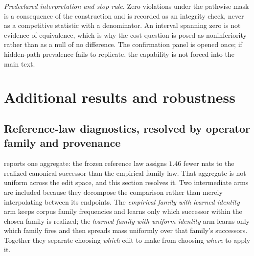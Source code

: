 \emph{Predeclared interpretation and stop rule.} Zero violations under the pathwise mask is a consequence of the construction and is recorded as an integrity check, never as a competitive statistic with a denominator. An interval spanning zero is not evidence of equivalence, which is why the cost question is posed as noninferiority rather than as a null of no difference. The confirmation panel is opened once; if hidden-path prevalence fails to replicate, the capability is not forced into the main text.

\section{Additional results and robustness}
\label{app:extended}


\subsection{Reference-law diagnostics, resolved by operator family and provenance}
\label{app:ext-rtheta}

 reports one aggregate: the frozen reference law assigns $1.46$ fewer nats to the realized canonical successor than the empirical-family law. That aggregate is not uniform across the edit space, and this section resolves it. Two intermediate arms are included because they decompose the comparison rather than merely interpolating between its endpoints. The \emph{empirical family with learned identity} arm keeps corpus family frequencies and learns only which successor within the chosen family is realized; the \emph{learned family with uniform identity} arm learns only which family fires and then spreads mass uniformly over that family's successors. Together they separate choosing \emph{which} edit to make from choosing \emph{where} to apply it.


